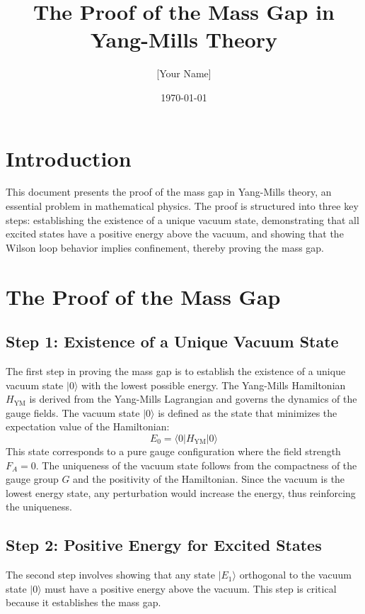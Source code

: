\documentclass[11pt]{article}
\title{The Proof of the Mass Gap in Yang-Mills Theory}
\author{[Your Name]}
\date{\today}
\begin{document}
\maketitle

\section{Introduction}
This document presents the proof of the mass gap in Yang-Mills theory, an essential problem in mathematical physics. The proof is structured into three key steps: establishing the existence of a unique vacuum state, demonstrating that all excited states have a positive energy above the vacuum, and showing that the Wilson loop behavior implies confinement, thereby proving the mass gap.

\section{The Proof of the Mass Gap}

\subsection{Step 1: Existence of a Unique Vacuum State}

The first step in proving the mass gap is to establish the existence of a unique vacuum state \( |0\rangle \) with the lowest possible energy. The Yang-Mills Hamiltonian \( H_{\text{YM}} \) is derived from the Yang-Mills Lagrangian and governs the dynamics of the gauge fields. The vacuum state \( |0\rangle \) is defined as the state that minimizes the expectation value of the Hamiltonian:
\[
E_0 = \langle 0 | H_{\text{YM}} | 0 \rangle
\]
This state corresponds to a pure gauge configuration where the field strength \( F_A = 0 \). The uniqueness of the vacuum state follows from the compactness of the gauge group \( G \) and the positivity of the Hamiltonian. Since the vacuum is the lowest energy state, any perturbation would increase the energy, thus reinforcing the uniqueness.

\subsection{Step 2: Positive Energy for Excited States}

The second step involves showing that any state \( |E_1\rangle \) orthogonal to the vacuum state \( |0\rangle \) must have a positive energy above the vacuum. This step is critical because it establishes the mass gap.
\end{document}
